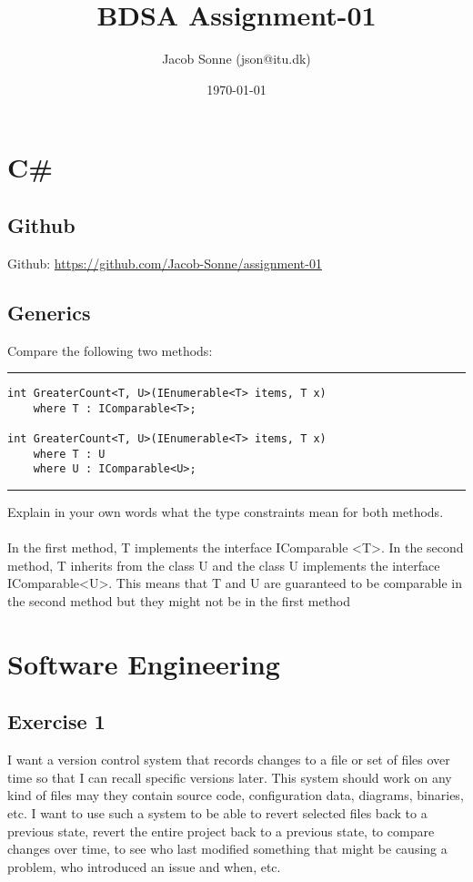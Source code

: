 \documentclass{article}
\title{BDSA Assignment-01}
\author{Jacob Sonne (json@itu.dk)}
\date{\today}
\begin{document}
\maketitle
\section*{C\#}
\subsection*{Github}
Github: \href{https://github.com/Jacob-Sonne/assignment-01}{https://github.com/Jacob-Sonne/assignment-01}

\subsection*{Generics}
Compare the following two methods:

\noindent\rule{\textwidth}{1pt}
\begin{lstlisting}
int GreaterCount<T, U>(IEnumerable<T> items, T x)
    where T : IComparable<T>;

int GreaterCount<T, U>(IEnumerable<T> items, T x)
    where T : U
    where U : IComparable<U>;
\end{lstlisting}
\noindent\rule{\textwidth}{1pt}
Explain in your own words what the type constraints mean for both methods.
\\\\
In the first method, T implements the interface IComparable \textless T\textgreater.
In the second method, T inherits from the class U and the class U implements the interface IComparable\textless U\textgreater. 
This means that T and U are guaranteed to be comparable in the second method but they might not be in the first method

\section*{Software Engineering}
\subsection*{Exercise 1}
I want a version control system that records changes to a file or set of files over time so that I can recall specific versions later. This system should work on any kind of files may they contain source code, configuration data, diagrams, binaries, etc.
\newline
\newline
I want to use such a system to be able to revert selected files back to a previous state, revert the entire project back to a previous state, to compare changes over time, to see who last modified something that might be causing a problem, who introduced an issue and when, etc.
\end{document}
